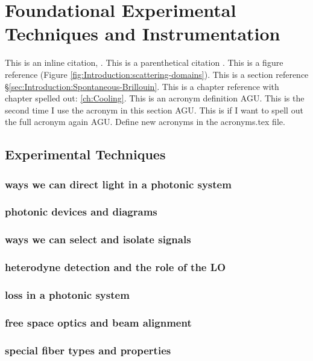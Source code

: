 \chapter{Foundational Experimental Techniques and Instrumentation}
\label{ch:Experimental}
\acresetall

This is an inline citation, \cite{boyd2020nonlinear}. This is a parenthetical citation \citep{boyd2020nonlinear}. This is a figure reference (Figure \ref{fig:Introduction:scattering-domains}). This is a section reference \S\ref{sec:Introduction:Spontaneous-Brillouin}. This is a chapter reference with chapter spelled out: \autoref{ch:Cooling}. This is an acronym definition \ac{AGU}. This is the second time I use the acronym in this section \ac{AGU}. This is if I want to spell out the full acronym again \acf{AGU}. Define new acronyms in the acronyms.tex file.


\section{Experimental Techniques}
\label{sec:Experimental:Experimental Techniques}
\lipsum[1]

  \subsection{ways we can direct light in a photonic system}
  \subsection{photonic devices and diagrams}
  \subsection{ways we can select and isolate signals}
  \subsection{heterodyne detection and the role of the LO}
  \subsection{loss in a photonic system}
  \subsection{free space optics and beam alignment}
  \subsection{special fiber types and properties}

